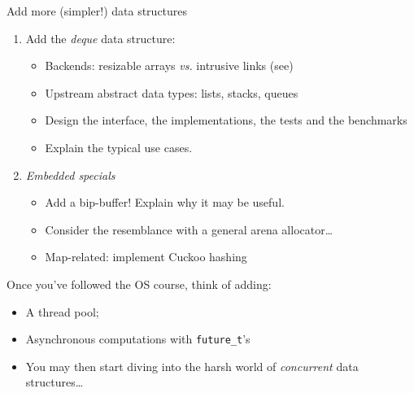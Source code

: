 \begin{frame}[fragile]{Add more (simpler!) data structures}

  \begin{enumerate}
  \item Add the {\em deque} data structure:
    \begin{itemize}
    \item Backends: resizable arrays {\em vs.} intrusive links (see)
    \item Upstream abstract data types: lists, stacks, queues
    \item Design the interface, the implementations, the tests and the benchmarks
    \item Explain the typical use cases.
    \end{itemize}

  \item {\em Embedded specials}
    \begin{itemize}
    \item Add a bip-buffer! Explain why it may be useful.
    \item Consider the resemblance with a general arena allocator\dots
    \item Map-related: implement Cuckoo hashing
    \end{itemize}
    
  \end{enumerate}

  Once you've followed the OS course, think of adding:
  \begin{itemize}
  \item A thread pool;
  \item Asynchronous computations with \lstinline{future_t}'s
  \item You may then start diving into the harsh world of {\em concurrent} data structures\dots
  \end{itemize}
  
\end{frame}


